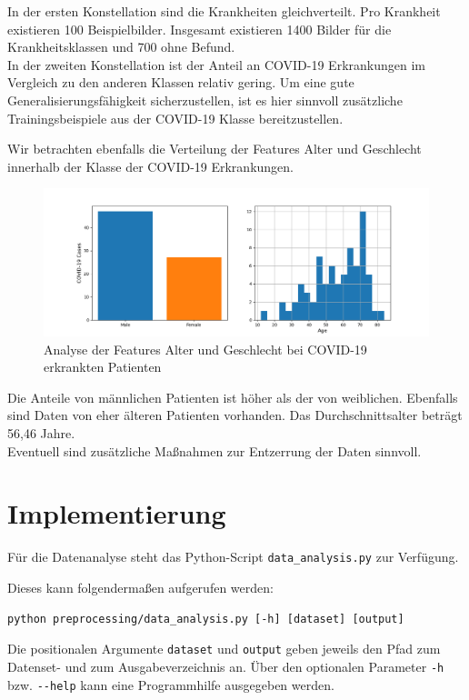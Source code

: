 In der ersten Konstellation sind die Krankheiten gleichverteilt. Pro Krankheit existieren 100 Beispielbilder. Insgesamt existieren 1400 Bilder für die Krankheitsklassen und 700 ohne Befund.\\
In der zweiten Konstellation ist der Anteil an COVID-19 Erkrankungen im Vergleich zu den anderen Klassen relativ gering.
Um eine gute Generalisierungsfähigkeit sicherzustellen, ist es hier sinnvoll zusätzliche Trainingsbeispiele aus der COVID-19 Klasse bereitzustellen.

Wir betrachten ebenfalls die Verteilung der Features Alter und Geschlecht innerhalb der Klasse der COVID-19 Erkrankungen.

\begin{figure}[ht]
	\centering
	\includegraphics[width=\textwidth]{../results/features_analysis.png}
	\caption{Analyse der Features Alter und Geschlecht bei COVID-19 erkrankten Patienten}
\end{figure}

Die Anteile von männlichen Patienten ist höher als der von weiblichen. Ebenfalls sind Daten von eher älteren Patienten vorhanden. Das Durchschnittsalter beträgt 56,46 Jahre.\\
Eventuell sind zusätzliche Maßnahmen zur Entzerrung der Daten sinnvoll.

\section{Implementierung}

Für die Datenanalyse steht das Python-Script \verb|data_analysis.py| zur Verfügung.

Dieses kann folgendermaßen aufgerufen werden:

\begin{verbatim}
python preprocessing/data_analysis.py [-h] [dataset] [output]
\end{verbatim}

Die positionalen Argumente \verb|dataset| und \verb|output| geben jeweils den Pfad zum Datenset- und zum Ausgabeverzeichnis an.
Über den optionalen Parameter \verb|-h| bzw. \verb|--help| kann eine Programmhilfe ausgegeben werden.